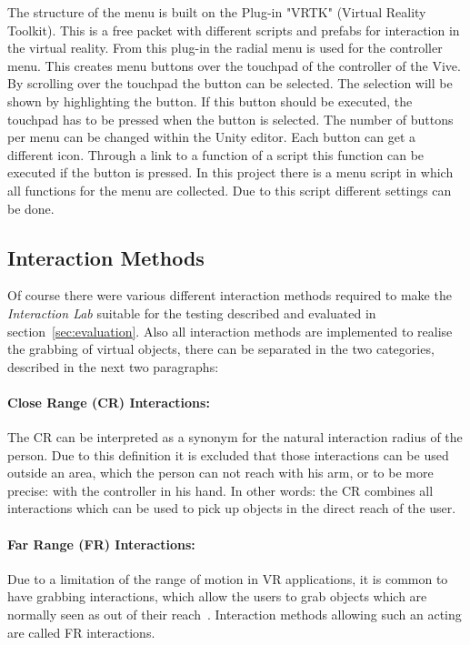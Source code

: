 The structure of the menu is built on the Plug-in "VRTK" (Virtual Reality Toolkit). %
This is a free packet with different scripts and prefabs for interaction in the virtual reality. From this plug-in the radial menu is used for the controller menu. This creates menu buttons over the touchpad of the controller of the Vive. By scrolling over the touchpad the button can be selected. The selection will be shown by highlighting the button. If this button should be executed, the touchpad has to be pressed when the button is selected. The number of buttons per menu can be changed within the Unity editor. Each button can get a different icon. Through a link to a function of a script this function can be executed if the button is pressed. In this project there is a menu script in which all functions for the menu are collected. Due to this script different settings can be done. %


\subsection{Interaction Methods}\label{sec:Interactions}
Of course there were various different interaction methods required to make the \textit{Interaction Lab} suitable for the testing described and evaluated in section~\ref{sec:evaluation}. Also all interaction methods are implemented to realise the grabbing of virtual objects, there can be separated in the two categories, described in the next two paragraphs:

\paragraph{Close Range (CR) Interactions:} The CR can be interpreted as a synonym for the natural interaction radius of the person. Due to this definition it is excluded that those interactions can be used outside an area, which the person can not reach with his arm, or to be more precise: with the controller in his hand. In other words: the CR combines all interactions which can be used to pick up objects in the direct reach of the user.

\paragraph{Far Range (FR) Interactions:} Due to a limitation of the range of motion in VR applications, it is common to have grabbing interactions, which allow the users to grab objects which are normally seen as out of their reach~\cite{VRBook}. Interaction methods allowing such an acting are called FR interactions. \\

